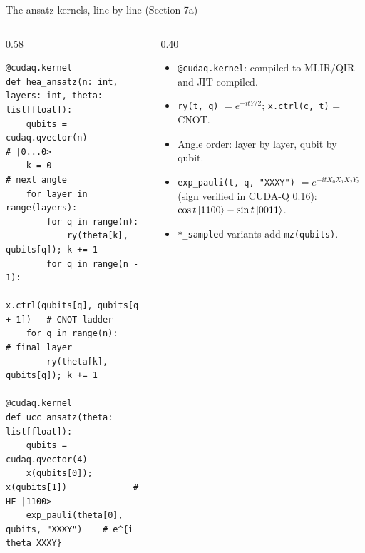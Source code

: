 \documentclass[aspectratio=169,11pt]{beamer}
\begin{document}
\begin{frame}[fragile]{The ansatz kernels, line by line (Section 7a)}
  \begin{columns}[T]
    \begin{column}{0.58\textwidth}
\begin{lstlisting}
@cudaq.kernel
def hea_ansatz(n: int, layers: int, theta: list[float]):
    qubits = cudaq.qvector(n)              # |0...0>
    k = 0                                  # next angle
    for layer in range(layers):
        for q in range(n):
            ry(theta[k], qubits[q]); k += 1
        for q in range(n - 1):
            x.ctrl(qubits[q], qubits[q + 1])   # CNOT ladder
    for q in range(n):                     # final layer
        ry(theta[k], qubits[q]); k += 1

@cudaq.kernel
def ucc_ansatz(theta: list[float]):
    qubits = cudaq.qvector(4)
    x(qubits[0]); x(qubits[1])             # HF |1100>
    exp_pauli(theta[0], qubits, "XXXY")    # e^{i theta XXXY}
\end{lstlisting}
    \end{column}
    \begin{column}{0.40\textwidth}
      \small
      \begin{itemize}
        \item \texttt{@cudaq.kernel}: compiled to MLIR/QIR and JIT-compiled.
        \item \texttt{ry(t, q)} $= e^{-itY/2}$; \texttt{x.ctrl(c, t)} = CNOT.
        \item Angle order: layer by layer, qubit by qubit.
        \item \texttt{exp\_pauli(t, q, "XXXY")} $= e^{+itX_0X_1X_2Y_3}$ (sign verified in CUDA-Q 0.16): $\cos t\ket{1100} - \sin t\ket{0011}$.
        \item \texttt{*\_sampled} variants add \texttt{mz(qubits)}.
      \end{itemize}
    \end{column}
  \end{columns}
\end{frame}
\end{document}
